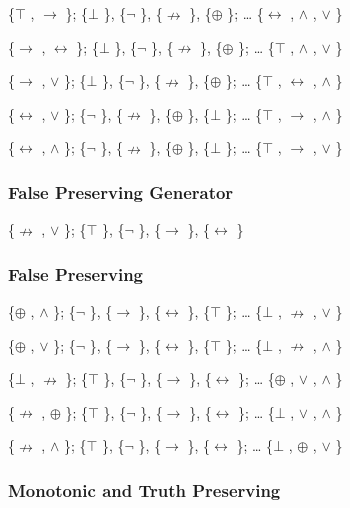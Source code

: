 \{$\top$ , $\to$ \}; \{$\bot$ \}, \{$\neg$ \}, \{$\nrightarrow$ \}, \{$\oplus$ \}; \ldots{} \{$\leftrightarrow$ , $\land$ , $\lor$ \}

\{$\to$ , $\leftrightarrow$ \}; \{$\bot$ \}, \{$\neg$ \}, \{$\nrightarrow$ \}, \{$\oplus$ \}; \ldots{} \{$\top$ , $\land$ , $\lor$ \}

\{$\to$ , $\lor$ \}; \{$\bot$ \}, \{$\neg$ \}, \{$\nrightarrow$ \}, \{$\oplus$ \}; \ldots{} \{$\top$ , $\leftrightarrow$ , $\land$ \}

\{$\leftrightarrow$ , $\lor$ \}; \{$\neg$ \}, \{$\nrightarrow$ \}, \{$\oplus$ \}, \{$\bot$ \}; \ldots{} \{$\top$ , $\to$ , $\land$ \}

\{$\leftrightarrow$ , $\land$ \}; \{$\neg$ \}, \{$\nrightarrow$ \}, \{$\oplus$ \}, \{$\bot$ \}; \ldots{} \{$\top$ , $\to$ , $\lor$ \}

\hypertarget{false-preserving-generator}{%
\subsubsection{False Preserving
Generator}\label{false-preserving-generator}}

\{$\nrightarrow$ , $\lor$ \}; \{$\top$ \}, \{$\neg$ \}, \{$\to$ \}, \{$\leftrightarrow$ \}

\hypertarget{false-preserving}{%
\subsubsection{False Preserving}\label{false-preserving}}

\{$\oplus$ , $\land$ \}; \{$\neg$ \}, \{$\to$ \}, \{$\leftrightarrow$ \}, \{$\top$ \}; \ldots{} \{$\bot$ , $\nrightarrow$ , $\lor$ \}

\{$\oplus$ , $\lor$ \}; \{$\neg$ \}, \{$\to$ \}, \{$\leftrightarrow$ \}, \{$\top$ \}; \ldots{} \{$\bot$ , $\nrightarrow$ , $\land$ \}

\{$\bot$ , $\nrightarrow$ \}; \{$\top$ \}, \{$\neg$ \}, \{$\to$ \}, \{$\leftrightarrow$ \}; \ldots{} \{$\oplus$ , $\lor$ , $\land$ \}

\{$\nrightarrow$ , $\oplus$ \}; \{$\top$ \}, \{$\neg$ \}, \{$\to$ \}, \{$\leftrightarrow$ \}; \ldots{} \{$\bot$ , $\lor$ , $\land$ \}

\{$\nrightarrow$ , $\land$ \}; \{$\top$ \}, \{$\neg$ \}, \{$\to$ \}, \{$\leftrightarrow$ \}; \ldots{} \{$\bot$ , $\oplus$ , $\lor$ \}

\hypertarget{monotonic-and-truth-preserving}{%
\subsubsection{Monotonic and Truth
Preserving}\label{monotonic-and-truth-preserving}}

